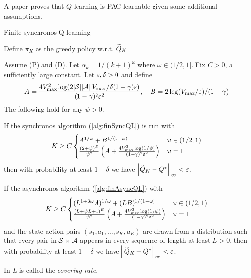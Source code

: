 A paper  proves that $Q$-learning is PAC-learnable
given some additional assumptions.

\begin{algorithm}[H] %
  \caption{Finite synchronos Q-learning}

  Define $\pi_K$ as the greedy policy w.r.t. $\widetilde{Q}_K$ \\
  \label{alg:finSyncQL}
\end{algorithm}


\begin{thm}[Mansour 2003]
  Assume (P) and (D). Let $\alpha_k = 1/(k+1)^\omega$ where
  $\omega \in (1/2,1]$.
  Fix $C>0$, a sufficiently large constant.
  Let $\varepsilon, \delta >0$ and define
  \[ A = \frac{4V^2_{\max} \log(2\abs{\mathcal{S}}\abs{\mathcal{A}} V_{\max}/\delta
  (1-\gamma)\varepsilon)}{(1-\gamma)^2\varepsilon^2}, \quad B= 2 \log(V_{\max}/\varepsilon)/(1-\gamma) \]
  The following hold for any $\psi > 0$.

  If the synchronos algorithm (\cref{alg:finSyncQL}) is run with
  \[ K \geq C \begin{cases}
      A^{1/\omega} + B^{1/(1-\omega)} & \omega \in (1/2,1)
      \\ \frac{(2 + \psi)^B}{\psi^2} \left(A +
      \frac{4 V^2_{\max} \log(1/\psi)}{(1-\gamma)^2 \varepsilon^2} \right)
      & \omega = 1
    \end{cases}
  \]
  then with probability at least $1-\delta$ we have
  $\norm{\widetilde{Q}_K - Q^*}_\infty < \varepsilon$.

  If the asynchronos algorithm (\cref{alg:finAsyncQL}) with 
  \[ K \geq C \begin{cases}
      (L^{1 + 3 \omega} A)^{1/\omega} + (L B)^{1/(1-\omega)}
      & \omega \in (1/2,1)
      \\ \frac{(L + \psi L + 1)^B}{\psi^2}
      \left(A + \frac{4V^2_{\max} \log(1/\psi)}{(1-\gamma)^2\varepsilon^2} \right)
	& \omega = 1
  \end{cases} \]
  and the state-action pairs $(s_1, a_1, \dots, s_K, a_K)$ are drawn
  from a distribution such that every pair in $\mathcal{S}\times\mathcal{A}$
  appears in every sequence of length at least $L > 0$,
  then with probability at least $1-\delta$ we have
  $\norm{\widetilde{Q}_K - Q^*}_\infty < \varepsilon$.
  \label{thm:mansour2003}
\end{thm}
In  $L$ is called the \emph{covering rate}.

